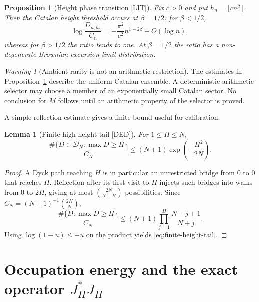 \documentclass[11pt]{amsart}
\numberwithin{equation}{section}
\theoremstyle{plain}
\newtheorem{proposition}[theorem]{Proposition}
\newtheorem{lemma}[theorem]{Lemma}
\theoremstyle{definition}
\theoremstyle{remark}
\newtheorem{warning}[theorem]{Warning}
\newcommand{\Mert}{M}
\newcommand{\LIT}{\textup{[LIT]}}
\newcommand{\DED}{\textup{[DED]}}
\begin{document}
\begin{proposition}[Height phase transition \LIT]
\label{prop:height-transition}
Fix $c>0$ and put $h_n=\lfloor c n^\beta\rfloor$.  Then the Catalan height threshold
occurs at $\beta=1/2$: for $\beta<1/2$,
\begin{equation}
\log\frac{D_{n,h_n}}{C_n}
=
-\frac{\pi^2}{c^2}n^{1-2\beta}+O(\log n),
\label{eq:subcritical-height}
\end{equation}
whereas for $\beta>1/2$ the ratio tends to one.  At $\beta=1/2$ the ratio has a
non-degenerate Brownian-excursion limit distribution.
\end{proposition}

\begin{warning}[Ambient rarity is not an arithmetic restriction]
\label{warn:ambient-rarity}
The estimates in Proposition~\ref{prop:height-transition} describe the uniform Catalan
ensemble.  A deterministic arithmetic selector may choose a member of an exponentially
small Catalan sector.  No conclusion for $\Mert$ follows until an arithmetic property of
the selector is proved.
\end{warning}

A simple reflection estimate gives a finite bound useful for calibration.

\begin{lemma}[Finite high-height tail \DED]
\label{lem:finite-height-tail}
For $1\le H\le N$,
\begin{equation}
\frac{\#\{D\in\mathcal D_N:\max D\ge H\}}{C_N}
\le
(N+1)\exp\!\left(-\frac{H^2}{2N}\right).
\label{eq:finite-height-tail}
\end{equation}
\end{lemma}

\begin{proof}
A Dyck path reaching $H$ is in particular an unrestricted bridge from $0$ to $0$ that
reaches $H$.  Reflection after its first visit to $H$ injects such bridges into walks from
$0$ to $2H$, giving at most $\binom{2N}{N+H}$ possibilities.  Since
$C_N=(N+1)^{-1}\binom{2N}{N}$,
\begin{equation}
\frac{\#\{D:\max D\ge H\}}{C_N}
\le
(N+1)\prod_{j=1}^{H}\frac{N-j+1}{N+j}.
\label{eq:tail-product}
\end{equation}
Using $\log(1-u)\le-u$ on the product yields \eqref{eq:finite-height-tail}.
\end{proof}

\section{Occupation energy and the exact operator \texorpdfstring{$J_H^*J_H$}{J*J}}
\label{sec:occupation-energy}
\end{document}
